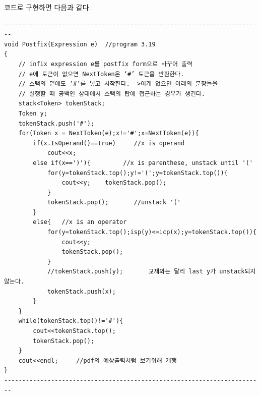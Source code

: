 \documentclass[a4paper,11pt]{article}
\begin{document}
코드로 구현하면 다음과 같다.
\\\begin{Verbatim}
------------------------------------------------------------------------
void Postfix(Expression e)  //program 3.19
{
    // infix expression e를 postfix form으로 바꾸어 출력
    // e에 토큰이 없으면 NextToken은 ‘#’ 토큰을 반환한다.
    // 스택의 밑에도 ‘#’를 넣고 시작한다.-->이게 없으면 아래의 문장들을
    // 실행할 때 공백인 상태에서 스택의 탑에 접근하는 경우가 생긴다.
    stack<Token> tokenStack;
    Token y;
    tokenStack.push('#');
    for(Token x = NextToken(e);x!='#';x=NextToken(e)){
        if(x.IsOperand()==true)     //x is operand
            cout<<x;
        else if(x==')'){         //x is parenthese, unstack until '('
            for(y=tokenStack.top();y!='(';y=tokenStack.top()){
                cout<<y;    tokenStack.pop();
            }
            tokenStack.pop();       //unstack '('
        }
        else{   //x is an operator
            for(y=tokenStack.top();isp(y)<=icp(x);y=tokenStack.top()){
                cout<<y;
                tokenStack.pop();
            }
            //tokenStack.push(y);       교재와는 달리 last y가 unstack되지 않는다.
            tokenStack.push(x);
        }           
    }
    while(tokenStack.top()!='#'){
        cout<<tokenStack.top();
        tokenStack.pop();
    }
    cout<<endl;     //pdf의 예상출력처럼 보기위해 개행
}
------------------------------------------------------------------------
\end{Verbatim}
\end{document}
